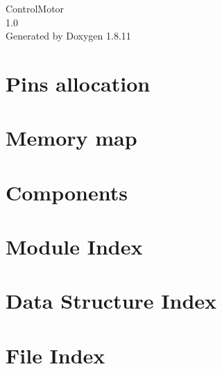\documentclass[twoside]{book}
\newcommand{\+}{\discretionary{\mbox{\scriptsize$\hookleftarrow$}}{}{}}
\newcommand{\clearemptydoublepage}{%
  \newpage{\pagestyle{empty}\cleardoublepage}%
}
\begin{document}
\hypersetup{pageanchor=false,
             bookmarksnumbered=true,
             pdfencoding=unicode
            }
\begin{titlepage}
\vspace*{7cm}
\begin{center}%
{\Large Control\+Motor \\[1ex]\large 1.\+0 }\\
\vspace*{1cm}
{\large Generated by Doxygen 1.8.11}\\
\end{center}
\end{titlepage}
\clearemptydoublepage
\tableofcontents
\clearemptydoublepage
{}
\hypersetup{pageanchor=true}

\chapter{Pins allocation}
\label{page_pinalloc}
\hypertarget{page_pinalloc}{}

\chapter{Memory map}
\label{page_memorymap}
\hypertarget{page_memorymap}{}

\chapter{Components}
\label{page_components}
\hypertarget{page_components}{}

\chapter{Module Index}

\chapter{Data Structure Index}

\chapter{File Index}

\end{document}
